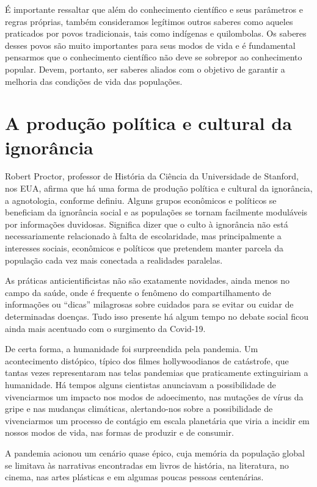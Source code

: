 É importante ressaltar que além do conhecimento científico e seus
parâmetros e regras próprias, também consideramos legítimos outros
saberes como aqueles praticados por povos tradicionais, tais como
indígenas e quilombolas. Os saberes desses povos são muito importantes
para seus modos de vida e é fundamental pensarmos que o conhecimento
científico não deve se sobrepor ao conhecimento popular. Devem,
portanto, ser saberes aliados com o objetivo de garantir a melhoria das
condições de vida das populações.

\section{A produção política e cultural da ignorância}

Robert Proctor, professor de História da Ciência da Universidade de
Stanford, nos EUA, afirma que há uma forma de produção política e
cultural da ignorância, a agnotologia, conforme definiu. Alguns grupos
econômicos e políticos se beneficiam da ignorância social e as
populações se tornam facilmente moduláveis por informações duvidosas.
Significa dizer que o culto à ignorância não está necessariamente
relacionado à falta de escolaridade, mas principalmente a interesses
sociais, econômicos e políticos que pretendem manter parcela da
população cada vez mais conectada a realidades paralelas.

As práticas anticientificistas não são exatamente novidades, ainda menos
no campo da saúde, onde é frequente o fenômeno do compartilhamento de
informações ou ``dicas'' milagrosas sobre cuidados para se evitar ou
cuidar de determinadas doenças. Tudo isso presente há algum tempo no
debate social ficou ainda mais acentuado com o surgimento da Covid-19.

De certa forma, a humanidade foi surpreendida pela pandemia. Um
acontecimento distópico, típico dos filmes hollywoodianos de catástrofe,
que tantas vezes representaram nas telas pandemias que praticamente
extinguiriam a humanidade. Há tempos alguns cientistas anunciavam a
possibilidade de vivenciarmos um impacto nos modos de adoecimento, nas
mutações de vírus da gripe e nas mudanças climáticas, alertando-nos
sobre a possibilidade de vivenciarmos um processo de contágio em escala
planetária que viria a incidir em nossos modos de vida, nas formas de
produzir e de consumir.

A pandemia acionou um cenário quase épico, cuja memória da população
global se limitava às narrativas encontradas em livros de história, na
literatura, no cinema, nas artes plásticas e em algumas poucas pessoas
centenárias.

